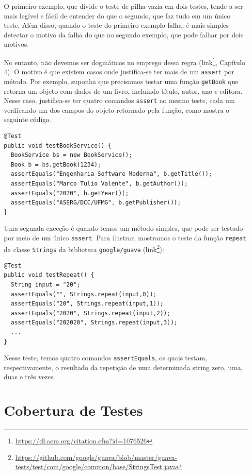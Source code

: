 \documentclass[
  11pt,
  twoside]{book}
\newcommand{\passthrough}[1]{#1}
\DeclareRobustCommand{\href}[2]{#2\footnote{\url{#1}}}
\begin{document}
O primeiro exemplo, que divide o teste de pilha vazia em dois testes,
tende a ser mais legível e fácil de entender do que o segundo, que faz
tudo em um único teste. Além disso, quando o teste do primeiro exemplo
falha, é mais simples detectar o motivo da falha do que no segundo
exemplo, que pode falhar por dois motivos.

No entanto, não devemos ser dogmáticos no emprego dessa regra
(\href{https://dl.acm.org/citation.cfm?id=1076526}{link}, Capítulo 4). O
motivo é que existem casos onde justifica-se ter mais de um
\passthrough{\lstinline!assert!} por método. Por exemplo, suponha que
precisamos testar uma função \passthrough{\lstinline!getBook!} que
retorna um objeto com dados de um livro, incluindo título, autor, ano e
editora. Nesse caso, justifica-se ter quatro comandos
\passthrough{\lstinline!assert!} no mesmo teste, cada um verificando um
dos campos do objeto retornado pela função, como mostra o seguinte
código.

\begin{lstlisting}
@Test
public void testBookService() {
  BookService bs = new BookService();
  Book b = bs.getBook(1234);
  assertEquals("Engenharia Software Moderna", b.getTitle());
  assertEquals("Marco Tulio Valente", b.getAuthor());
  assertEquals("2020", b.getYear());
  assertEquals("ASERG/DCC/UFMG", b.getPublisher());
}
\end{lstlisting}

Uma segunda exceção é quando temos um método simples, que pode ser
testado por meio de um único \passthrough{\lstinline!assert!}. Para
ilustrar, mostramos o teste da função \passthrough{\lstinline!repeat!}
da classe \passthrough{\lstinline!Strings!} da biblioteca
\passthrough{\lstinline!google/guava!}
(\href{https://github.com/google/guava/blob/master/guava-tests/test/com/google/common/base/StringsTest.java}{link}):

\begin{lstlisting}
@Test
public void testRepeat() {
  String input = "20";
  assertEquals("", Strings.repeat(input,0));
  assertEquals("20", Strings.repeat(input,1));
  assertEquals("2020", Strings.repeat(input,2));
  assertEquals("202020", Strings.repeat(input,3));
  ...
}
\end{lstlisting}

Nesse teste, temos quatro comandos
\passthrough{\lstinline!assertEquals!}, os quais testam,
respectivamente, o resultado da repetição de uma determinada string
zero, uma, duas e três vezes.

\hypertarget{cobertura-de-testes}{%
\section{Cobertura de Testes}\label{cobertura-de-testes}}
\end{document}
